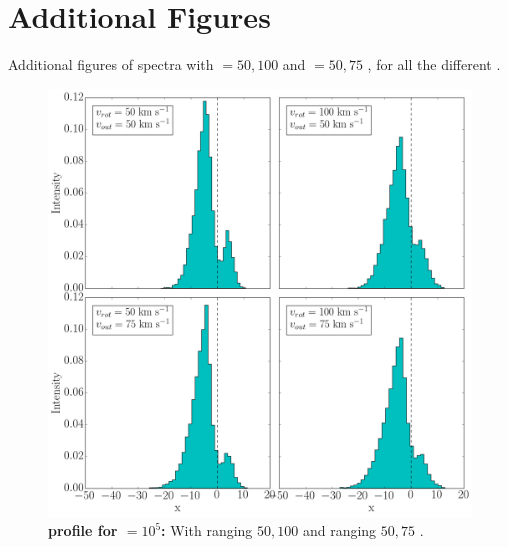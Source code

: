 \documentclass{latex/emulateapj}
\begin{document}




\newpage


\appendix
\section{Additional Figures}

Additional figures of spectra with \vrot $= 50,100$ \kms and \vout $= 50,75$ \kms, for all the different \tauh. 

\begin{figure}[h!]
	\begin{center}
		\includegraphics[width=1\textwidth]{./figures/appendix/2_tau10E5_phi83-90}
	\end{center}
	\caption{\textbf{\lya profile for \tauh$=10^5$:} With \vrot ranging $50,100$ \kms and \vout ranging $50,75$ \kms.
		\label{fig:2_tau10E5_phi83-90}}
\end{figure}
\end{document}
